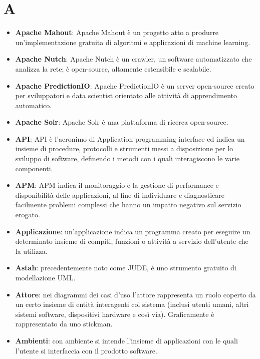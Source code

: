 \documentclass[a4paper, oneside, openany]{article}
\begin{document}
\copertina{}
\tableofcontents
\newpage
\section{A}
\begin{itemize}
\item \textbf{Apache Mahout}: Apache Mahout è un progetto atto a produrre un'implementazione gratuita di algoritmi e applicazioni di machine learning.
\item \textbf{Apache Nutch}: Apache Nutch è un crawler, un software automatizzato che analizza la rete; è open-source, altamente estensibile e scalabile.
\item \textbf{Apache PredictionIO}: Apache PredictionIO è un server open-source creato per sviluppatori e data scientist orientato alle attività di apprendimento automatico.
\item \textbf{Apache Solr}: Apache Solr è una piattaforma di ricerca open-source.
\item \textbf{API}: API è l'acronimo di Application programming interface ed indica un insieme di procedure, protocolli e strumenti messi a disposizione per lo sviluppo di software, definendo i metodi con i quali interagiscono le varie componenti.
\item \textbf{APM}: APM indica il monitoraggio e la gestione di performance e disponibilità delle applicazioni, al fine di individuare e diagnosticare facilmente problemi complessi che hanno un impatto negativo sul servizio erogato.
\item \textbf{Applicazione}: un'applicazione indica un programma creato per eseguire un determinato insieme di compiti, funzioni o attività a servizio dell'utente che la utilizza.
\item \textbf{Astah}: precedentemente noto come JUDE, è uno strumento gratuito di modellazione UML.
\item \textbf{Attore}: nei diagrammi dei casi d'uso l'attore rappresenta un ruolo coperto da un certo insieme di entità interagenti col sistema (inclusi utenti umani, altri sistemi software, dispositivi hardware e così via). Graficamente è rappresentato da uno stickman.
\item \textbf{Ambienti}: con ambiente si intende l'insieme di applicazioni con le quali l'utente si  interfaccia con il prodotto software.
\end{itemize}
\end{document}

